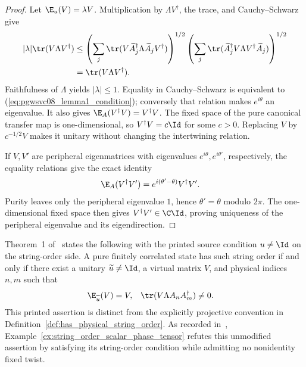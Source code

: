 \begin{proof}
    Let $\E_u(V)=\lambda V$.  Multiplication by $\Lambda V^\dagger$, the
    trace, and Cauchy--Schwarz give
    \begin{align}
        |\lambda|\tr(V\Lambda V^\dagger)
         & \le
        \left(\sum_j\tr(V\widetilde A_j^\dagger\Lambda
        \widetilde A_jV^\dagger)\right)^{1/2}
        \left(\sum_j\tr(\widetilde A_j^\dagger V\Lambda V^\dagger
        \widetilde A_j)\right)^{1/2} \\
         & =\tr(V\Lambda V^\dagger).
        \notag
    \end{align}
    Faithfulness of $\Lambda$ yields $|\lambda|\le1$.  Equality in
    Cauchy--Schwarz is equivalent to
    (\ref{eq:pgwsvc08_lemma1_condition}); conversely that relation makes
    $e^{i\theta}$ an eigenvalue.  It also gives
    $\E_A(V^\dagger V)=V^\dagger V$.  The fixed space of the pure canonical
    transfer map is one-dimensional, so
    $V^\dagger V=c\Id$ for some $c>0$.  Replacing $V$ by
    $c^{-1/2}V$ makes it unitary without changing the intertwining relation.

    If $V,V'$ are peripheral eigenmatrices with eigenvalues
    $e^{i\theta},e^{i\theta'}$, respectively, the equality relations give the
    exact identity
    \begin{align}
        \E_A(V^\dagger V')
         & =e^{i(\theta'-\theta)}V^\dagger V'.
        \notag
    \end{align}
    Purity leaves only the peripheral eigenvalue $1$, hence
    $\theta'=\theta$ modulo $2\pi$.  The one-dimensional fixed space then
    gives $V^\dagger V'\in\C\Id$, proving uniqueness of the peripheral
    eigenvalue and its eigendirection.
\end{proof}

\begin{theorem}
    \label{thm:pgwsvc08_physical_string_order}
    \notready
    Theorem~1 of~\cite{PerezGarcia2008StringOrder} states the following with
    the printed source condition $u\ne\Id$ on the string-order side.
    A pure finitely correlated state has such string order if and only if
    there exist a unitary $\widetilde u\ne\Id$, a virtual matrix $V$,
    and physical indices $n,m$ such that
    \begin{align}
        \E_{\widetilde u}(V) & =V,
                             & \tr(V\Lambda A_nA_m^\dagger) & \ne0.
        \label{eq:pgwsvc08_theorem1}
    \end{align}
    This printed assertion is distinct from the explicitly projective
    convention in Definition~\ref{def:has_physical_string_order}.
    As recorded in~\cite{gap:pgwsvc08_string_order_scalar_phase},
    Example~\ref{ex:string_order_scalar_phase_tensor} refutes this unmodified
    assertion by satisfying its string-order condition while admitting no
    nonidentity fixed twist.
\end{theorem}

